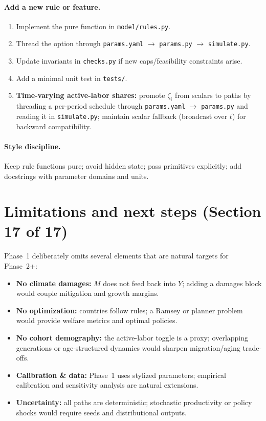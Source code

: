 \documentclass[12pt,a4paper]{article}
\newcommand{\code}[1]{\texttt{#1}}
\begin{document}
\paragraph{Add a new rule or feature.}
\begin{enumerate}[leftmargin=1.5em]
  \item Implement the pure function in \code{model/rules.py}.
  \item Thread the option through \code{params.yaml} $\to$ \code{params.py} $\to$ \code{simulate.py}.
  \item Update invariants in \code{checks.py} if new caps/feasibility constraints arise.
  \item Add a minimal unit test in \code{tests/}.
  \item \textbf{Time-varying active-labor shares:} promote $\zeta_i$ from scalars to paths by threading a per-period schedule through \code{params.yaml} $\to$ \code{params.py} and reading it in \code{simulate.py}; maintain scalar fallback (broadcast over $t$) for backward compatibility.
\end{enumerate}

\paragraph{Style discipline.} Keep rule functions pure; avoid hidden state; pass primitives explicitly; add docstrings with parameter domains and units.



\section{Limitations and next steps (Section 17 of 17)}
Phase~1 deliberately omits several elements that are natural targets for Phase~2+:
\begin{itemize}[leftmargin=1.25em]
  \item \textbf{No climate damages:} $M$ does not feed back into $Y$; adding a damages block would couple mitigation and growth margins.
  \item \textbf{No optimization:} countries follow rules; a Ramsey or planner problem would provide welfare metrics and optimal policies.
  \item \textbf{No cohort demography:} the active-labor toggle is a proxy; overlapping generations or age-structured dynamics would sharpen migration/aging trade-offs.
  \item \textbf{Calibration \& data:} Phase~1 uses stylized parameters; empirical calibration and sensitivity analysis are natural extensions.
  \item \textbf{Uncertainty:} all paths are deterministic; stochastic productivity or policy shocks would require seeds and distributional outputs.
\end{itemize}
\end{document}
